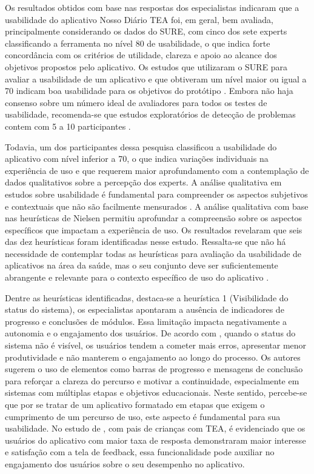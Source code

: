 \documentclass[portuguese]{textolivre}
\begin{document}
Os resultados obtidos com base nas respostas dos especialistas indicaram que a usabilidade do aplicativo Nosso Diário TEA foi, em geral, bem avaliada, principalmente considerando os dados do SURE, com cinco dos sete experts classificando a ferramenta no nível 80 de usabilidade, o que indica forte concordância com os critérios de utilidade, clareza e apoio ao alcance dos objetivos propostos pelo aplicativo. Os estudos que utilizaram o SURE para avaliar a usabilidade de um aplicativo e que obtiveram um nível maior ou igual a 70 indicam boa usabilidade para os objetivos do protótipo \cite{wangenheim2014sure,marques2020usability,silva2024qualiplus}. Embora não haja consenso sobre um número ideal de avaliadores para todos os testes de usabilidade, recomenda-se que estudos exploratórios de detecção de problemas contem com 5 a 10 participantes \cite{macefield2009participantsize}.

Todavia, um dos participantes dessa pesquisa classificou a usabilidade do aplicativo com nível inferior a 70, o que indica variações individuais na experiência de uso e que requerem maior aprofundamento com a contemplação de dados qualitativos sobre a percepção dos experts. A análise qualitativa em estudos sobre usabilidade é fundamental para compreender os aspectos subjetivos e contextuais que não são facilmente mensurados \cite{mator2021usability}. A análise qualitativa com base nas heurísticas de Nielsen permitiu aprofundar a compreensão sobre os aspectos específicos que impactam a experiência de uso. Os resultados revelaram que seis das dez heurísticas foram identificadas nesse estudo. Ressalta-se que não há necessidade de contemplar todas as heurísticas para avaliação da usabilidade de aplicativos na área da saúde, mas o seu conjunto deve ser suficientemente abrangente e relevante para o contexto específico de uso do aplicativo \cite{galavi2024heuristics}.

Dentre as heurísticas identificadas, destaca-se a heurística 1 (Visibilidade do status do sistema), os especialistas apontaram a ausência de indicadores de progresso e conclusões de módulos. Essa limitação impacta negativamente a autonomia e o engajamento dos usuários. De acordo com \textcite{bouraghi2022evaluating}, quando o status do sistema não é visível, os usuários tendem a cometer mais erros, apresentar menor produtividade e não manterem o engajamento ao longo do processo. Os autores sugerem o uso de elementos como barras de progresso e mensagens de conclusão para reforçar a clareza do percurso e motivar a continuidade, especialmente em sistemas com múltiplas etapas e objetivos educacionais. Neste sentido, percebe-se que por se tratar de um aplicativo formatado em etapas que exigem o cumprimento de um percurso de uso, este aspecto é fundamental para sua usabilidade. No estudo de \textcite{bonnot2021mobile}, com pais de crianças com TEA, é evidenciado que os usuários do aplicativo com maior taxa de resposta demonstraram maior interesse e satisfação com a tela de feedback, essa funcionalidade pode auxiliar no engajamento dos usuários sobre o seu desempenho no aplicativo.
\end{document}

